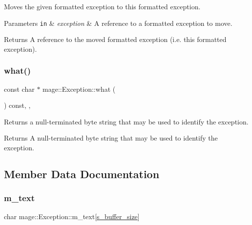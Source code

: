 Moves the given formatted exception to this formatted exception.


\begin{DoxyParams}[1]{Parameters}
\mbox{\tt in}  & {\em exception} & A reference to a formatted exception to move. \\
\hline
\end{DoxyParams}
\begin{DoxyReturn}{Returns}
A reference to the moved formatted exception (i.\+e. this formatted exception). 
\end{DoxyReturn}
\mbox{\label{classmage_1_1_exception_ae2bd4437e2b7c960f022f7d3bf79baa7}} 
\subsubsection{\texorpdfstring{what()}{what()}}
{\footnotesize\ttfamily const char $\ast$ mage\+::\+Exception\+::what (\begin{DoxyParamCaption}{ }\end{DoxyParamCaption}) const\hspace{0.3cm}{\ttfamily [override]}, {\ttfamily [virtual]}, {\ttfamily [noexcept]}}

Returns a null-\/terminated byte string that may be used to identify the exception.

\begin{DoxyReturn}{Returns}
A null-\/terminated byte string that may be used to identify the exception. 
\end{DoxyReturn}


\subsection{Member Data Documentation}
\mbox{\label{classmage_1_1_exception_ad5bd9bb044bebaa1bac36c8c8a25c052}} 
\subsubsection{\texorpdfstring{m\+\_\+text}{m\_text}}
{\footnotesize\ttfamily char mage\+::\+Exception\+::m\+\_\+text\mbox{[}\mbox{\hyperlink{classmage_1_1_exception_a41c9eb8e4a238210822170dfa211e493}{s\+\_\+buffer\+\_\+size}}\mbox{]}\hspace{0.3cm}{\ttfamily [private]}}

